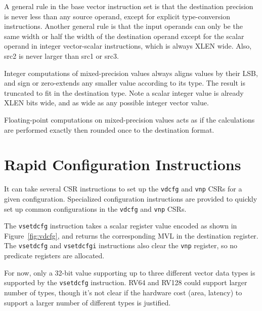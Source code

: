 A general rule in the base vector instruction set is that the
destination precision is never less than any source operand, except
for explicit type-conversion instructions.  Another general rule is
that the input operands can only be the same width or half the width
of the destination operand except for the scalar operand in integer
vector-scalar instructions, which is always XLEN wide.  Also, src2 is
never larger than src1 or src3.

Integer computations of mixed-precision values always aligns values by
their LSB, and sign or zero-extends any smaller value according to its
type.  The result is truncated to fit in the destination type.  Note a
scalar integer value is already XLEN bits wide, and as wide as any
possible integer vector value.

Floating-point computations on mixed-precision values acts as if the
calculations are performed exactly then rounded once to the
destination format.

\section{Rapid Configuration Instructions}

It can take several CSR instructions to set up the {\tt vdcfg} and
{\tt vnp} CSRs for a given configuration.  Specialized configuration
instructions are provided to quickly set up common configurations in
the {\tt vdcfg} and {\tt vnp} CSRs.

The {\tt vsetdcfg} instruction takes a scalar register value encoded as
shown in Figure~\ref{fig:vdcfg}, and returns the corresponding MVL in
the destination register.  The {\tt vsetdcfg} and {\tt vsetdcfgi}
instructions also clear the {\tt vnp} register, so no predicate
registers are allocated.

\begin{discussion}
  For now, only a 32-bit value supporting up to three different vector
  data types is supported by the {\tt vsetdcfg} instruction.  RV64 and
  RV128 could support larger number of types, though it's not clear if
  the hardware cost (area, latency) to support a larger number of
  different types is justified.
\end{discussion}

